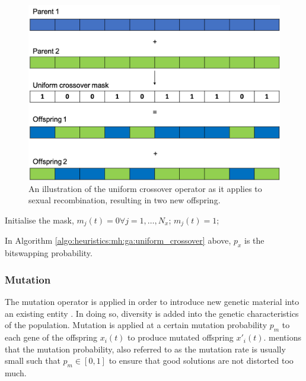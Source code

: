 \begin{figure}[htbp]
      \includegraphics[width=\textwidth]{images/uniform_crossover.png}
      \caption{An illustration of the uniform crossover operator as it applies to sexual recombination, resulting in two new offspring.}
      \label{fig:heuristics:mh:ga:uniform_crossover}
\end{figure}


\begin{algorithm}[H]
      \caption{The pseudo code for the uniform crossover operator as used by \acp{GA}.}
      \label{algo:heuristics:mh:ga:uniform_crossover}
      \begin{algorithmic}
            \State Initialise the mask, $m_{j}(t) = 0 \forall j = 1, \dots, N_{x}$;
            \State $m_{j}(t) = 1$;
            \EndIf
            \EndFor
            \State
      \end{algorithmic}
\end{algorithm}

In Algorithm \ref{algo:heuristics:mh:ga:uniform_crossover} above, $p_{x}$ is the bitswapping probability.


\subsubsection{Mutation}
\label{sec:heuristics:mh:ga:mutation}

The mutation operator is applied in order to introduce new genetic material into an existing entity \cite{ref:engelbrecht:2007}. In doing so, diversity is added into the genetic characteristics of the population. Mutation is applied at a certain mutation probability $p_{m}$ to each gene of the offspring $x_{i}(t)$ to produce mutated offspring $x'_{i}(t)$. \citeauthor{ref:engelbrecht:2007}\cite{ref:engelbrecht:2007} mentions that the mutation probability, also referred to as the mutation rate is usually small such that $p_{m} \in [0,1]$ to ensure that good solutions are not distorted too much.

